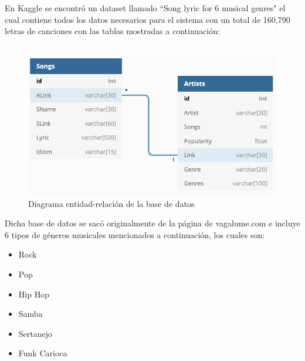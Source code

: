 \documentclass[12pt, a4paper, titlepage]{report}
\begin{document}
		En Kaggle \cite{kaggle} se encontró un dataset llamado “Song lyric for 6 musical genres" \cite{kaggleDataset} el cual contiene todos los datos necesarios para el sistema con un total de 160,790 letras de canciones con las tablas mostradas a continuación:\\\\
		\begin{figure}[H]
			\includegraphics[width=12cm]{./imagenes/Disenio/Iteracion_1/Base_de_Datos/diagrama_ER_BD.jpg}
			\centering 
			\caption{Diagrama entidad-relación de la base de datos}
		\end{figure}
		Dicha base de datos se sacó originalmente de la página de vagalume.com \cite{vagalume} e incluye 6 tipos de géneros musicales mencionados a continuación, los cuales son:
		\begin{itemize}
			\item Rock
			\item Pop
			\item Hip Hop
			\item Samba
			\item Sertanejo
			\item Funk Carioca
		\end{itemize}
	
\end{document}
